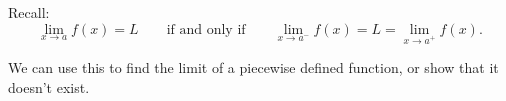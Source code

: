 \begin{frame}
Recall:
\[
\lim_{x\rightarrow a}f(x) = L \qquad \text{if and only if} \qquad \lim_{x\rightarrow a^-}f(x) = L = \lim_{x\rightarrow a^+}f(x) .
\]

We can use this to find the limit of a piecewise defined function, or show that it doesn't exist.
\end{frame}
